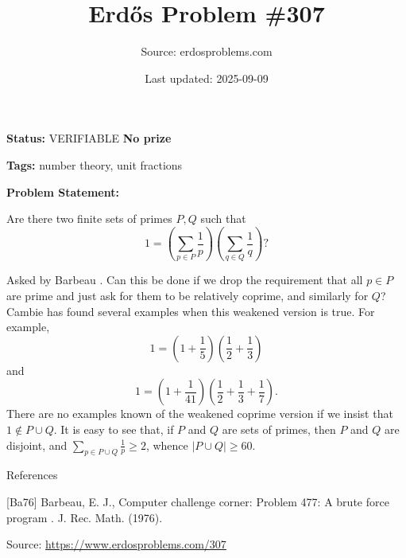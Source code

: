 \documentclass{article}
\title{Erd\H{o}s Problem \#307}
\date{Last updated: 2025-09-09}
\author{Source: erdosproblems.com}
\begin{document}
\maketitle

\noindent\textbf{Status:} VERIFIABLE \quad \textbf{No prize}

\noindent\textbf{Tags:} number theory, unit fractions

\medskip

\noindent\textbf{Problem Statement:}

Are there two finite sets of primes $P,Q$ such that\[1=\left(\sum_{p\in P}\frac{1}{p}\right)\left(\sum_{q\in Q}\frac{1}{q}\right)?\]




Asked by Barbeau \cite{Ba76}. Can this be done if we drop the requirement that all $p\in P$ are prime and just ask for them to be relatively coprime, and similarly for $Q$? Cambie has found several examples when this weakened version is true. For example,\[1=\left(1+\frac{1}{5}\right)\left(\frac{1}{2}+\frac{1}{3}\right)\]and\[1=\left(1+\frac{1}{41}\right)\left(\frac{1}{2}+\frac{1}{3}+\frac{1}{7}\right).\]There are no examples known of the weakened coprime version if we insist that $1\not\in P\cup Q$. It is easy to see that, if $P$ and $Q$ are sets of primes, then $P$ and $Q$ are disjoint, and $\sum_{p\in P\cup Q}\frac{1}{p}\geq 2$, whence $\lvert P\cup Q\rvert \geq 60$.




References

[Ba76] Barbeau, E. J., Computer challenge corner: Problem 477: A brute force program . J. Rec. Math. (1976).

\bigskip
\noindent\small{Source: \url{https://www.erdosproblems.com/307}}
\end{document}
